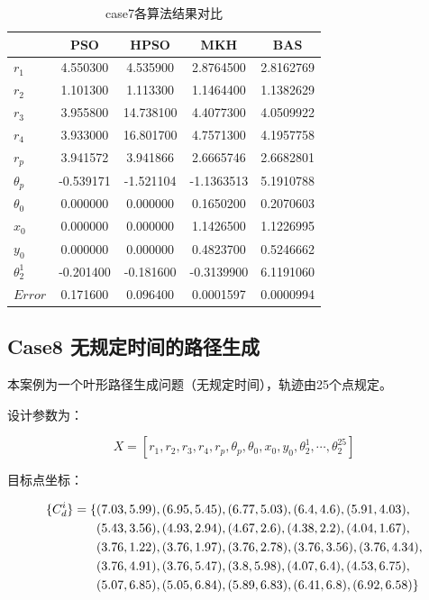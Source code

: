 \documentclass[]{ctexbook}
\begin{document}
\begin{table}[t]

\caption{\label{tab:case7table}case7各算法结果对比}
\centering
\begin{tabular}{lcccc}
\toprule
  & PSO & HPSO & MKH & BAS\\
\midrule
$r_1$ & 4.550300 & 4.535900 & 2.8764500 & 2.8162769\\
$r_2$ & 1.101300 & 1.113300 & 1.1464400 & 1.1382629\\
$r_3$ & 3.955800 & 14.738100 & 4.4077300 & 4.0509922\\
$r_4$ & 3.933000 & 16.801700 & 4.7571300 & 4.1957758\\
$r_p$ & 3.941572 & 3.941866 & 2.6665746 & 2.6682801\\
\addlinespace
$\theta_p$ & -0.539171 & -1.521104 & -1.1363513 & 5.1910788\\
$\theta_0$ & 0.000000 & 0.000000 & 0.1650200 & 0.2070603\\
$x_0$ & 0.000000 & 0.000000 & 1.1426500 & 1.1226995\\
$y_0$ & 0.000000 & 0.000000 & 0.4823700 & 0.5246662\\
$\theta_2^1$ & -0.201400 & -0.181600 & -0.3139900 & 6.1191060\\
\addlinespace
$Error$ & 0.171600 & 0.096400 & 0.0001597 & 0.0000994\\
\bottomrule
\end{tabular}
\end{table}

\subsection{Case8 无规定时间的路径生成}\label{case8-}

本案例为一个叶形路径生成问题（无规定时间），轨迹由25个点规定。

设计参数为：

\[
X = [r_1,r_2,r_3,r_4,r_p,\theta_p,\theta_0,x_0,y_0,\theta_2^1,\cdots,\theta_2^{25}]
\]

目标点坐标：

\begin{align}
\{C_d^i\} = \{&(7.03,5.99),(6.95,5.45),(6.77,5.03),(6.4,4.6),(5.91,4.03), \notag \\
&(5.43,3.56),(4.93,2.94),(4.67,2.6),(4.38,2.2),(4.04,1.67),\notag \\
&(3.76,1.22),(3.76,1.97),(3.76,2.78),(3.76,3.56),(3.76,4.34), \notag \\
&(3.76,4.91),(3.76,5.47),(3.8,5.98),(4.07,6.4),(4.53,6.75), \notag \\
&(5.07,6.85),(5.05,6.84),(5.89,6.83),(6.41,6.8),(6.92,6.58)\} \notag \\
\end{align}
\end{document}
